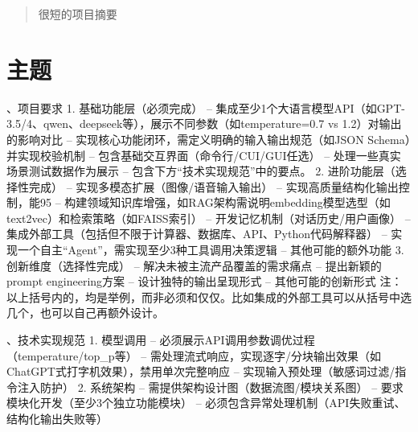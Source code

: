 \documentclass{article}
\theoremstyle{plain}
\theoremstyle{definition}
\theoremstyle{remark}
\begin{document}

\begin{abstract}
很短的项目摘要
\end{abstract}

\section{主题}

、项目要求
1. 基础功能层（必须完成）
–  集成至少1个大语言模型API（如GPT-3.5/4、qwen、deepseek等），展示不同参数（如temperature=0.7 vs 1.2）对输出的影响对比
–  实现核心功能闭环，需定义明确的输入输出规范（如JSON Schema）并实现校验机制
–  包含基础交互界面（命令行/CUI/GUI任选）
–  处理一些真实场景测试数据作为展示
–  包含下方“技术实现规范”中的要点。
2. 进阶功能层（选择性完成）
–  实现多模态扩展（图像/语音输入输出）
–  实现高质量结构化输出控制，能95%
–  构建领域知识库增强，如RAG架构需说明embedding模型选型（如text2vec）和检索策略（如FAISS索引）
–  开发记忆机制（对话历史/用户画像）
–  集成外部工具（包括但不限于计算器、数据库、API、Python代码解释器）
–  实现一个自主“Agent”，需实现至少3种工具调用决策逻辑
–  其他可能的额外功能
3. 创新维度（选择性完成）
–  解决未被主流产品覆盖的需求痛点
–  提出新颖的prompt engineering方案
–  设计独特的输出呈现形式
–  其他可能的创新形式
   注：以上括号内的，均是举例，而非必须和仅仅。比如集成的外部工具可以从括号中选几个，也可以自己再额外设计。

、技术实现规范
1. 模型调用
–  必须展示API调用参数调优过程（temperature/top_p等）
–  需处理流式响应，实现逐字/分块输出效果（如ChatGPT式打字机效果），禁用单次完整响应
–  实现输入预处理（敏感词过滤/指令注入防护）
2. 系统架构
–  需提供架构设计图（数据流图/模块关系图）
–  要求模块化开发（至少3个独立功能模块）
–  必须包含异常处理机制（API失败重试、结构化输出失败等）
\end{document}
